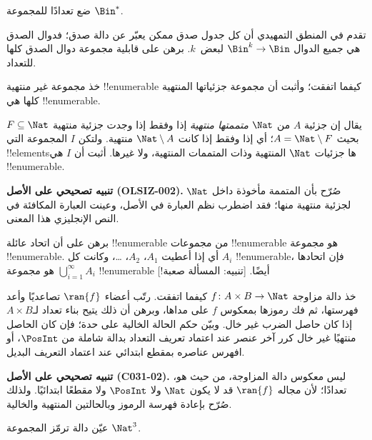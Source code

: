 \documentclass[../../../include/open-logic-section]{subfiles}
\begin{document}
\begin{prob}
ضع تعدادًا للمجموعة $\Bin^*$.
\end{prob}

\begin{prob}
تقدم في المنطق التمهيدي أن كل جدول صدق ممكن يعبّر عن دالة صدق؛
فدوال الصدق هي جميع الدوال $\Bin^k \to \Bin$ لبعض~$k$.
برهن على قابلية مجموعة دوال الصدق كلها للتعداد.
\end{prob}

\begin{prob}
خذ مجموعة غير منتهية !!{enumerable} كيفما اتفقت؛ وأثبت أن مجموعة
جزئياتها المنتهية كلها هي !!{enumerable}.
\end{prob}

\begin{prob}
يقال إن جزئية $A$ من $\Nat$ \emph{متممتها منتهية} إذا وفقط إذا وجدت
جزئية منتهية $F\subseteq\Nat$ بحيث $A=\Nat\setminus F$؛ أي إذا وفقط إذا
كانت $\Nat\setminus A$ منتهية. ولتكن $I$ المجموعة التي !!{element}sها
جزئيات $\Nat$ المنتهية وذات المتممات المنتهية، ولا غيرها. أثبت أن $I$
هي !!{enumerable}.
\end{prob}

\begin{editorial}
\textbf{تنبيه تصحيحي على الأصل (OLSIZ-002).} صُرّح بأن المتممة مأخوذة
داخل $\Nat$ لجزئية منتهية منها؛ فقد اضطرب نظم العبارة في الأصل،
وعينت العبارة المكافئة في النص الإنجليزي هذا المعنى.
\end{editorial}

\begin{prob}
برهن على أن اتحاد عائلة !!{enumerable} من مجموعات !!{enumerable}
هو مجموعة !!{enumerable}. أي إذا أعطيت $A_1$، $A_2$، \dots{}، وكانت كل
$A_i$ !!{enumerable}، فإن اتحادها $\bigcup_{i=1}^\infty
A_i$ هو مجموعة !!{enumerable} أيضًا. [تنبيه: المسألة صعبة!]
\end{prob}

\begin{prob}
خذ دالة مزاوجة $f \colon A \times B \to \Nat$ كيفما اتفقت.
رتّب أعضاء $\ran{f}$ تصاعديًا وأعد فهرستها، ثم فك رموزها بمعكوس $f$
على مداها، وبرهن أن ذلك يتيح بناء تعداد لـ$A \times B$ إذا كان حاصل
الضرب غير خال. وبيّن حكم الحالة الخالية على حدة؛ فإن كان الحاصل منتهيًا
غير خال كرر آخر عنصر عند اعتماد تعريف التعداد بدالة شاملة من $\PosInt$،
أو افهرس عناصره بمقطع ابتدائي عند اعتماد التعريف البديل.
\end{prob}

\textbf{تنبيه تصحيحي على الأصل (C031-02).} ليس معكوس دالة المزاوجة، من حيث هو،
تعدادًا؛ لأن مجاله $\ran{f}$ قد لا يكون $\Nat$ ولا $\PosInt$ ولا مقطعًا
ابتدائيًا. ولذلك صُرّح بإعادة فهرسة الرموز وبالحالتين المنتهية والخالية.

\begin{prob}
عيّن دالة ترمّز المجموعة $\Nat^3$.
\end{prob}
\end{document}
